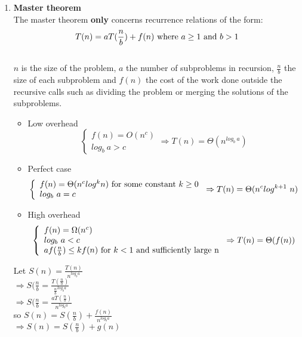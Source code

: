 \documentclass[11pt]{article}
\begin{document}
\begin{enumerate}
    \item \textbf{Master theorem}
    \\ The master theorem \textbf{only} concerns recurrence relations of the form:
    \begin{equation}T(n)=aT(\frac{n}{b}) + f(n) \textnormal{ where } a \geq 1 \textnormal{ and } b > 1\end{equation}
    \\ $n$ is the size of the problem, $a$ the number of subproblems in recursion, 
    $\frac{n}{b}$ the size of each subproblem and $f(n)$ the cost of the work done outside the recursive calls
    such as dividing the problem or merging the solutions of the subproblems.
    \begin{itemize}
        \item Low overhead
        \begin{equation}
        \left\{
            \begin{array}{ll}
                f(n)=O(n^c) \\
                log_b\ a > c
            \end{array}
        \right. \Rightarrow T(n) = \Theta(n^{log_b\ a})
        \end{equation}
        \item Perfect case
        \begin{equation}
        \left\{
            \begin{array}{ll}
                f(n)=\Theta(n^{c}log^{k}n) \textnormal{ for some constant } k \geq 0 \\
                log_b\ a = c
            \end{array}
        \right. \Rightarrow T(n) = \Theta(n^{c}log^{k+1}\ n)
        \end{equation}
        \item High overhead
        \begin{equation}
        \left\{
            \begin{array}{ll}
                f(n)=\Omega(n^c) \\
                log_b\ a < c \\
                af(\frac{n}{b}) \leq kf(n) \textnormal{ for } k < 1 \textnormal{ and sufficiently large n}
            \end{array}
        \right. \Rightarrow T(n) = \Theta(f(n))
        \end{equation}
    \end{itemize}
    Let $S(n) = \frac{T(n)}{n^{log_{b}a}}$
    \\ $\Rightarrow S(\frac{n}{b} = \frac{T(\frac{n}{b})}{\frac{n}{b}^{log_{b}a}}$
    \\ $\Rightarrow S(\frac{n}{b} = \frac{aT(\frac{n}{b})}{n^{log_{b}a}}$
    \\ so $S(n) = S(\frac{n}{b}) + \frac{f(n)}{n^{log_{b}a}}$
    \\ $\Rightarrow S(n) = S(\frac{n}{b}) + g(n)$
    

\end{enumerate}
\end{document}
